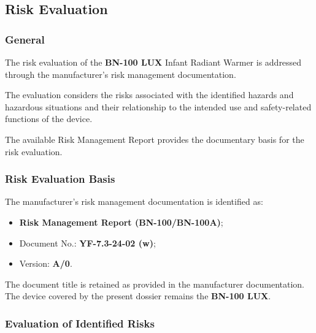 
\hypertarget{p3-4-2}{}

\subsection{Risk Evaluation}

\subsubsection{General}

The risk evaluation of the \textbf{BN-100 LUX} Infant Radiant Warmer is
addressed through the manufacturer's risk management documentation.

The evaluation considers the risks associated with the identified hazards
and hazardous situations and their relationship to the intended use and
safety-related functions of the device.

The available Risk Management Report provides the documentary basis for the
risk evaluation.

\subsubsection{Risk Evaluation Basis}

The manufacturer's risk management documentation is identified as:

\begin{itemize}

    \item \textbf{Risk Management Report (BN-100/BN-100A)};

    \item Document No.: \textbf{YF-7.3-24-02 (w)};

    \item Version: \textbf{A/0}.

\end{itemize}

The document title is retained as provided in the manufacturer
documentation. The device covered by the present dossier remains the
\textbf{BN-100 LUX}.

\subsubsection{Evaluation of Identified Risks}

